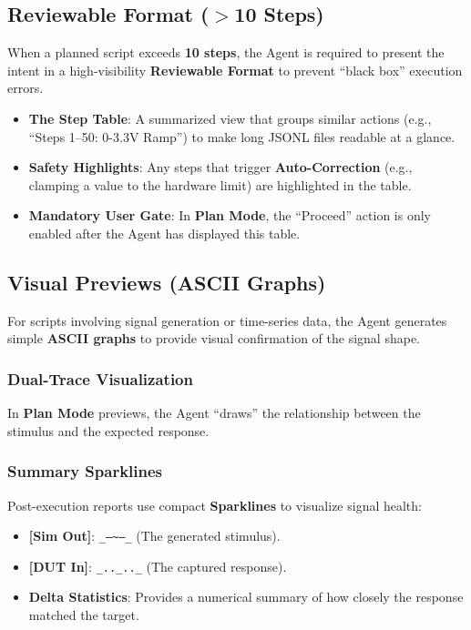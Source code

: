 \documentclass[conference]{IEEEtran}
\begin{document}
\subsection{Reviewable Format ($>$10 Steps)}
When a planned script exceeds \textbf{10 steps}, the Agent is required to present the intent in a high-visibility \textbf{Reviewable Format} to prevent ``black box'' execution errors.
\begin{itemize}
    \item \textbf{The Step Table}: A summarized view that groups similar actions (e.g., ``Steps 1--50: 0-3.3V Ramp'') to make long JSONL files readable at a glance.
    \item \textbf{Safety Highlights}: Any steps that trigger \textbf{Auto-Correction} (e.g., clamping a value to the hardware limit) are highlighted in the table.
    \item \textbf{Mandatory User Gate}: In \textbf{Plan Mode}, the ``Proceed'' action is only enabled after the Agent has displayed this table.
\end{itemize}

\subsection{Visual Previews (ASCII Graphs)}
For scripts involving signal generation or time-series data, the Agent generates simple \textbf{ASCII graphs} to provide visual confirmation of the signal shape.
\subsubsection{Dual-Trace Visualization}
In \textbf{Plan Mode} previews, the Agent ``draws'' the relationship between the stimulus and the expected response.
\subsubsection{Summary Sparklines}
Post-execution reports use compact \textbf{Sparklines} to visualize signal health:
\begin{itemize}
    \item \textbf{[Sim Out]}: \texttt{\_--\textasciitilde--\_} (The generated stimulus).
    \item \textbf{[DUT In]}: \texttt{\_..\_..\_} (The captured response).
    \item \textbf{Delta Statistics}: Provides a numerical summary of how closely the response matched the target.
\end{itemize}
\end{document}
